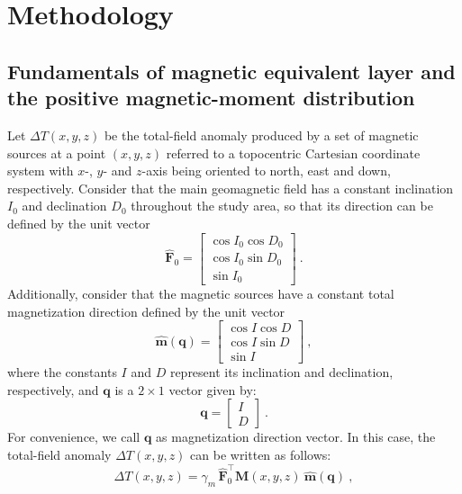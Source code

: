 \section{Methodology}
\label{sec:methodology}

\subsection{Fundamentals of magnetic equivalent layer and the positive magnetic-moment distribution}
\label{subsec:mag_eqlayer}

Let $\Delta T(x, y, z)$ be the total-field anomaly produced by a set of magnetic
sources at a point $(x, y, z)$ referred to a topocentric Cartesian coordinate system 
with $x$-, $y$- and $z$-axis being oriented to north, east and down, respectively.
Consider that the main geomagnetic field has a constant inclination $I_{0}$ and declination
$D_{0}$ throughout the study area, so that its direction can be defined by the unit vector
\begin{equation}
\hat{\mathbf{F}}_{0} = \begin{bmatrix}
\cos I_{0} \cos D_{0} \\
\cos I_{0} \sin D_{0} \\
\sin I_{0}
\end{bmatrix} \: .
\label{eq:main_field}
\end{equation}
Additionally, consider that the magnetic sources have a constant total magnetization 
direction defined by the unit vector
\begin{equation}
\hat{\mathbf{m}}(\mathbf{q}) = \begin{bmatrix}
\cos {I} \cos {D} \\
\cos {I} \sin {D} \\
\sin {I}
\end{bmatrix} \: ,
\label{eq:mag_vec}
\end{equation}
where the constants $I$ and $D$ represent its inclination and declination, respectively,
and $\mathbf{q}$ is a $2 \times 1$ vector given by:
\begin{equation}
\mathbf{q} = \begin{bmatrix}
I \\ 
D
\end{bmatrix} \: .
\label{eq:q_vector}
\end{equation}
For convenience, we call $\mathbf{q}$ as magnetization direction vector.
In this case, the total-field anomaly $\Delta T(x, y, z)$ can be written as follows:
\begin{equation}
\Delta T(x, y, z) = \gamma_{m} \, \hat{\mathbf{F}}_{0}^{\top} \mathbf{M}(x, y, z) \: 
\hat{\mathbf{m}}(\mathbf{q}) \: ,
\label{eq:tfanomaly}
\end{equation}
